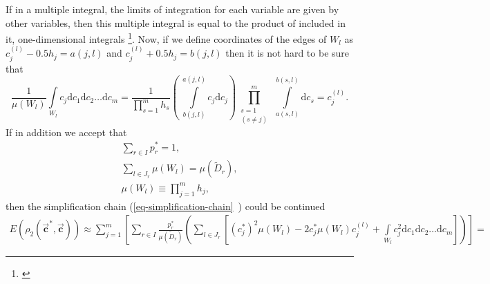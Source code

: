 \documentclass[11pt,a4paper]{article}
\numberwithin{equation}{subsection}
\newcommand{\vecc}{\vec{\textbf{c}}}
\begin{document}
If in a multiple integral, the limits of integration for each variable are given by other variables, then this multiple integral is equal to the product of included in it, one-dimensional integrals \footnote{\cite{stewart_2008_int}}. Now, if we define coordinates of the edges of $W_{l}$ as $c_{j}^{(l)} - 0.5h_{j} = a(j,l)$ and $c_{j}^{(l)} + 0.5h_{j} = b(j,l)$ then it is not hard to be sure that 
\begin{equation}
\frac{1}{\mu(W_{l})} \int\limits_{W_l} c_{j} \mathrm{d} c_{1} \mathrm{d} c_{2} \ldots  \mathrm{d} c_{m} 
	= \dfrac{1}{\prod\limits_{s=1}^{m}h_{s}}
	\left( \  \int\limits_{b(j,l)}^{a(j,l)} c_{j}  \mathrm{d} c_{j}\right) 
	\prod_{\substack{s=1\\ (s\ne j)}}^m \ 
	\int\limits_{a(s,l)}^{b(s,l)} \!  \mathrm{d} c_{s} 
	= c_{j}^{(l)}.
\end{equation}
If in addition we accept that
\begin{gather}
\sum\limits_{r \in I} p_{r}^{*} =1, \\
\sum\limits_{l \in J_{r}} \mu(W_{l}) =\mu(\tilde{D}_{r}), \\
\mu(W_{l}) \equiv \prod\limits_{j=1}^{m}h_{j},
\end{gather}
then the simplification chain (\vref{eq-simplification-chain}~) could be continued
\begin{gather}
\nonumber
E(\rho_{2}(\vecc^{*},\vecc)) \approx \sum\limits_{j=1}^{m}  \left[ \sum\limits_{r \in I} \frac{p_{r}^{*}}{\mu(\tilde{D}_{r})} \left( \sum\limits_{l \in J_{r}} \left[ (c_{j}^{*})^{2} \mu(W_{l}) - 2c_{j}^{*} \mu(W_{l}) c_{j}^{(l)} + \int\limits_{W_{l}} c_{j}^{2} \mathrm{d}c_{1} \mathrm{d}c_{2} \dots \mathrm{d}c_{m} \right] \right) \right] = 
\end{gather}
\end{document}
